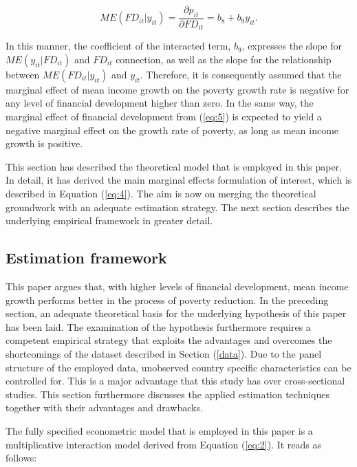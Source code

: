 \documentclass[12pt, a4paper]{article}
\begin{document}
\begin{equation} \label{eq:5}
ME(FD_{it}|y_{it}) = \frac{\partial p_{it}}{\partial FD_{it}} = b_{8} + b_{9}y_{it}.
\end{equation}

In this manner, the coefficient of the interacted term, $b_{9}$, expresses the slope for $ME(y_{it}|FD_{it})$ and $FD_{it}$ connection, as well as the slope for the relationship between $ME(FD_{it}|y_{it})$ and $y_{it}$. Therefore, it is consequently assumed that the marginal effect of mean income growth on the poverty growth rate is negative for any level of financial development higher than zero. In the same way, the marginal effect of financial development from (\ref{eq:5}) is expected to yield a negative marginal effect on the growth rate of poverty, as long as mean income growth is positive.

This section has described the theoretical model that is employed in this paper. In detail, it has derived the main marginal effects formulation of interest, which is described in Equation (\ref{eq:4}). The aim is now on merging the theoretical groundwork with an adequate estimation strategy. The next section describes the underlying empirical framework in greater detail.


\subsection{Estimation framework}

This paper argues that, with higher levels of financial development, mean income growth performs better in the process of poverty reduction. In the preceding section, an adequate theoretical basis for the underlying hypothesis of this paper has been laid. The examination of the hypothesis furthermore requires a competent empirical strategy that exploits the advantages and overcomes the shortcomings of the dataset described in Section (\ref{data}). Due to the panel structure of the employed data, unobserved country specific characteristics can be controlled for. This is a major advantage that this study has over cross-sectional studies. This section furthermore discusses the applied estimation techniques together with their advantages and drawbacks.

The fully specified econometric model that is employed in this paper is a multiplicative interaction model derived from Equation (\ref{eq:2}). It reads as follows:
\end{document}
